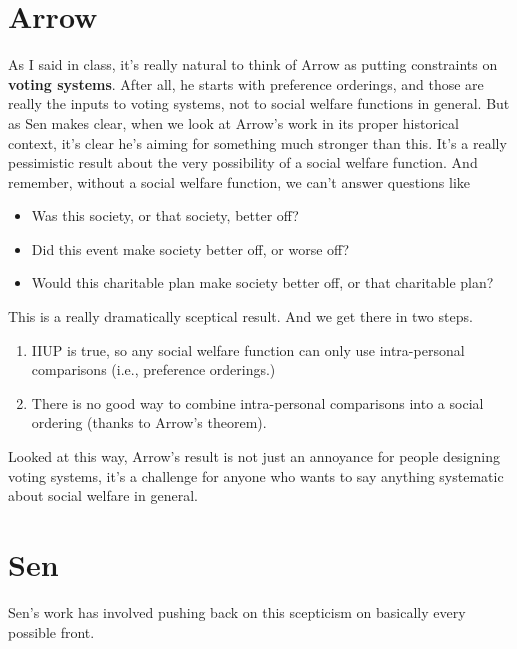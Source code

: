 \section{Arrow}
\label{arrow}

As I said in class, it's really natural to think of Arrow as putting constraints on \textbf{voting systems}. After all, he starts with preference orderings, and those are really the inputs to voting systems, not to social welfare functions in general. But as Sen makes clear, when we look at Arrow's work in its proper historical context, it's clear he's aiming for something much stronger than this. It's a really pessimistic result about the very possibility of a social welfare function. And remember, without a social welfare function, we can't answer questions like

\begin{itemize}
\item{} Was this society, or that society, better off?

\item{} Did this event make society better off, or worse off?

\item{} Would this charitable plan make society better off, or that charitable plan?

\end{itemize}
This is a really dramatically sceptical result. And we get there in two steps.

\begin{enumerate}
\item{} IIUP is true, so any social welfare function can only use intra-personal comparisons (i.e., preference orderings.)

\item{} There is no good way to combine intra-personal comparisons into a social ordering (thanks to Arrow's theorem).

\end{enumerate}
Looked at this way, Arrow's result is not just an annoyance for people designing voting systems, it's a challenge for anyone who wants to say anything systematic about social welfare in general.

\section{Sen}
\label{sen}

Sen's work has involved pushing back on this scepticism on basically every possible front.

